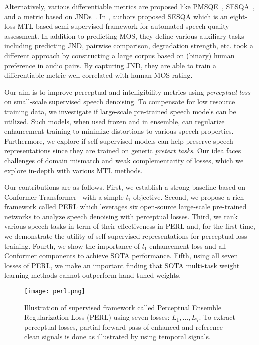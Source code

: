 \documentclass{article}
\newcommand{\squeezeup}{\vspace{-2.5mm}}
\begin{document}
Alternatively, various differentiable metrics are proposed like \ac{PMSQE}~\cite{martin2018deep}, \ac{SESQA}~\cite{serra2020sesqa}, and a metric based on \ac{JNDs}~\cite{manocha2020differentiable}.
In \cite{serra2020sesqa}, authors proposed \ac{SESQA} which is an eight-loss \ac{MTL} based semi-supervised framework for automated speech quality assessment.
In addition to predicting \ac{MOS}, they define various auxiliary tasks including predicting JND, pairwise comparison, degradation strength, etc.
\cite{manocha2020differentiable} took a different approach by constructing a large corpus based on (binary) human preference in audio pairs.
By capturing JND, they are able to train a differentiable metric well correlated with human \ac{MOS} rating.

Our aim is to improve perceptual and intelligibility metrics using \emph{perceptual loss} on small-scale supervised speech denoising.
To compensate for low resource training data, we investigate if large-scale pre-trained speech models can be utilized.
Such models, when used frozen and in ensemble, can regularize enhancement training to minimize distortions to various speech properties.
Furthermore, we explore if self-supervised models can help preserve speech representations since they are trained on generic \emph{pretext tasks}.
Our idea faces challenges of domain mismatch and weak complementarity of losses, which we explore in-depth with various \ac{MTL} methods.

Our contributions are as follows.
First, we establish a strong baseline based on Conformer Transformer~\cite{gulati2020conformer} with a simple $l_1$ objective.
Second, we propose a rich framework called \ac{PERL} which leverages six open-source large-scale pre-trained networks to analyze speech denoising with perceptual losses.
Third, we rank various speech tasks in term of their effectiveness in PERL and, for the first time, we demonstrate the utility of self-supervised representations for perceptual loss training.
Fourth, we show the importance of $l_1$ enhancement loss and all Conformer components to achieve \ac{SOTA} performance.
Fifth, using all seven losses of PERL, we make an important finding that \ac{SOTA} multi-task weight learning methods cannot outperform hand-tuned weights.

\begin{figure*}[ht]
    \centering
    \texttt{[image: perl.png]}
\caption{Illustration of supervised framework called Perceptual Ensemble Regularization Loss (PERL) using seven losses: $L_1,\dots,L_7$. To extract perceptual losses, partial forward pass of enhanced and reference clean signals is done as illustrated by using temporal signals.}
    \squeezeup
    \label{fig:perl}
\end{figure*}
\end{document}
